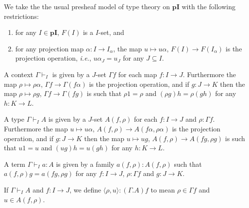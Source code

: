 \documentclass[english]{PaperTools/latex/lipics}
\def\pI{\ensuremath{\mathbf{pI}}}
\def\ie{\textit{i.e.}}
\begin{document}
\bigskip
We take the the usual presheaf model of type theory on \pI{} with the
following restrictions:
\begin{enumerate}
  \item for any $I ∈ \pI$, $F(I)$ is a $I$-set, and
  \item for any projection map $α : I → I_α$, the
    map $u ↦ uα$, $F(I) → F(I_α)$ is the projection operation, \ie,
    $uα_J = u_J$ for any $J ⊆ I$.
\end{enumerate}

\bigskip
A context $Γ ⊢_I$ is given by a $J$-set $Γf$ for each map $f : I → J$.
Furthermore the map $ρ ↦ ρα$, $Γf → Γ(fα)$ is the projection operation,
and if $g : J → K$ then the map $ρ ↦ ρg$, $Γf → Γ(fg)$ is such that
$ρ1 = ρ$ and $(ρg)h = ρ(gh)$ for any $h : K → L$.

\medskip
A type $Γ ⊢_I A$ is given by a $J$-set $A(f,ρ)$ for each $f : I → J$ and
$ρ : Γf$.
Furthermore the map $u ↦ uα$, $A(f,ρ) → A(fα,ρα)$ is the projection operation,
and if $g : J → K$ then the map $u ↦ ug$, $A(f,ρ) → A(fg,ρg)$ is such that
$u1 = u$ and $(ug)h = u(gh)$ for any $h : K → L$.

\medskip
A term $Γ ⊢_I a : A$ is given by a family $a(f,ρ) : A(f,ρ)$ such that
$a(f,ρ)g = a(fg,ρg)$ for any $f : I → J$, $ρ : Γf$ and $g : J → K$.

\medskip
If $Γ ⊢_I A$ and $f : I → J$, we define $⟨ρ,u⟩ : (Γ.A)f$ to mean
$ρ ∈ Γf$ and $u ∈ A(f,ρ)$.
\end{document}

